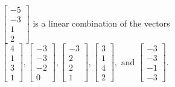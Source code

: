 \begin{exercise}
\begin{exerciseStatement}
  \end{exerciseStatement}
  \begin{exerciseAnswer}
   \(\left[\begin{array}{c}
-5 \\
-3 \\
1 \\
2
\end{array}\right]\) 
  	 is  
	a linear combination of the vectors \(\left[\begin{array}{c}
4 \\
1 \\
3 \\
1
\end{array}\right] , \left[\begin{array}{c}
-3 \\
-3 \\
-2 \\
0
\end{array}\right] , \left[\begin{array}{c}
-3 \\
2 \\
2 \\
1
\end{array}\right] , \left[\begin{array}{c}
3 \\
1 \\
4 \\
2
\end{array}\right] , \text{ and } \left[\begin{array}{c}
-3 \\
-3 \\
-1 \\
-3
\end{array}\right]\).

	
  


  \end{exerciseAnswer}
\end{exercise}